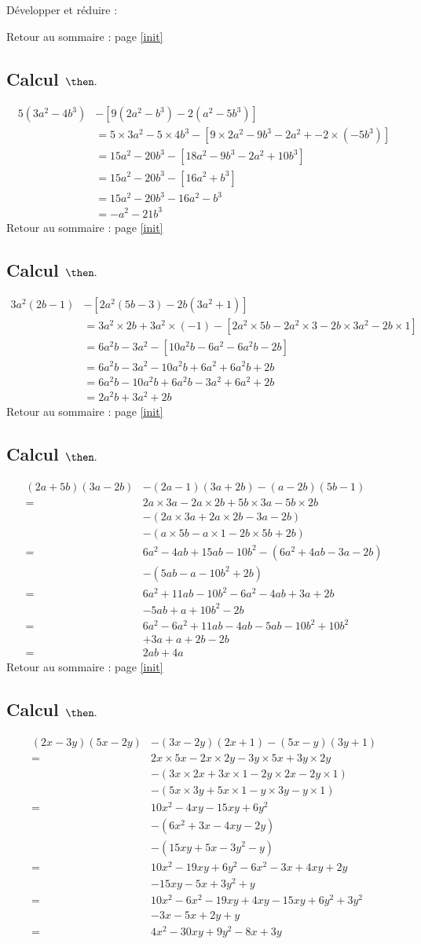 \documentclass[14pt]{article}
\theoremstyle{remark}
\newcounter{n}
\renewcommand{\it}{Retour au sommaire : page \ref{init}
	\subsection{Calcul $ \mathbf{ \then}.$}\label{\then} \stepcounter{n} }
\theoremstyle{plain}
\begin{document}
Développer et réduire : 

\it \begin{align*}5(3a^2-4b^3)&-[9(2a^2-b^3)-2(a^2-5b^3)]
\\
& = 5\times 3a^2 - 5\times 4b^3 - [9\times 2a^2 -9b^3 -2a^2+-2\times (-5b^3)]\\
& = 15 a^2 - 20b^3 - [18a^2-9b^3-2a^2+10b^3]\\
&= 15a^2-20b^3-[16a^2+b^3]\\
&= 15a^2-20b^3-16a^2 - b^3\\
&= -a^2 -21b^3
\end{align*}
\it \begin{align*}3a^2(2b-1)&-[2a^2(5b-3)-2b(3a^2+1)]
\\ & = 3a^2\times 2b +3a^2\times (-1) - [2a^2\times5b
-2a^2\times3-2b\times3a^2-2b\times1]
\\ &=6a^2b - 3a^2 - [10a^2b-6a^2-6a^2b-2b]\\
&=6a^2b-3a^2 -10a^2b+6a^2+6a^2b+2b\\
&=6a^2b-10a^2b+6a^2b-3a^2+6a^2+2b\\
&= 2a^2b+3a^2+2b
\end{align*}
\it \begin{align*}(2a+5b)(3a-2b)&-(2a-1)(3a+2b)-(a-2b)(5b-1)\\
=& 2a\times 3a -2a\times 2b + 5b\times 3a -5b\times 2b 
\\&- (2a\times 3a +2a\times2b-3a-2b)\\
&- (a\times5b-a\times1-2b\times5b+2b)\\
=&6a^2-4ab+15ab-10b^2-(6a^2+4ab-3a-2b)\\
&- (5ab-a-10b^2+2b)\\
=&6a^2+11ab-10b^2-6a^2-4ab+3a+2b\\
&-5ab+a+10b^2-2b\\
=& 6a^2-6a^2 +11ab-4ab-5ab-10b^2+10b^2\\
&+3a+a+2b-2b\\
=& 2ab+4a
\end{align*}
\it \begin{align*}(2x-3y)(5x-2y)&-(3x-2y)(2x+1)-(5x-y)(3y+1)\\
=&2x\times5x-2x\times2y-3y\times5x+3y\times2y\\
&- (3x\times2x+3x\times1-2y\times2x-2y\times1)\\
&- (5x\times3y+5x\times1-y\times3y-y\times1)\\
=&10x^2-4xy-15xy+6y^2\\
&-(6x^2+3x-4xy-2y)\\
&-(15xy+5x-3y^2-y)\\
=&10x^2-19xy+6y^2-6x^2-3x+4xy+2y \\
&- 15xy-5x+3y^2+y\\
=&10x^2-6x^2-19xy+4xy-15xy+6y^2+3y^2\\
&-3x-5x+2y+y\\
=& 4x^2-30xy+9y^2-8x+3y
\end{align*}
\end{document}
